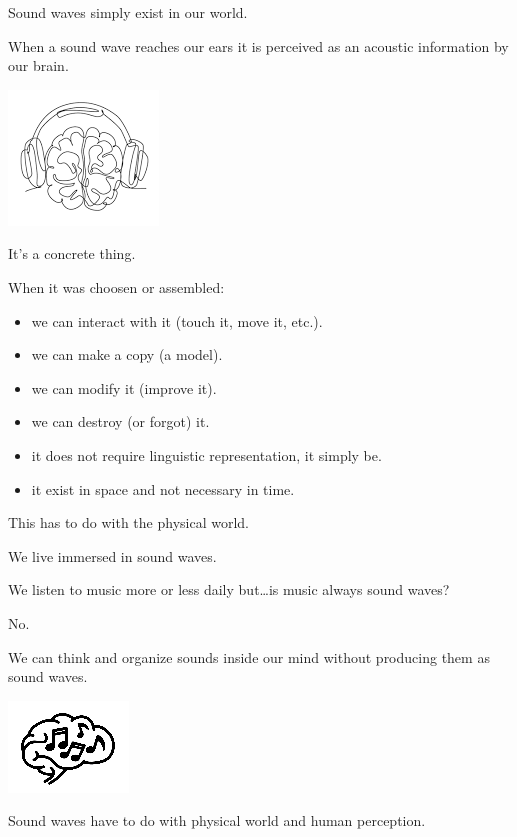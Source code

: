 Sound waves simply exist in our world.

When a sound wave reaches our ears it is perceived as an acoustic information by our brain.

\begin{center}
\includegraphics[scale=0.5]{../img/percezione.png}
\end{center}

It's a concrete thing.

When it was choosen or assembled:

\begin{itemize}
\tightlist
\item we can interact with it (touch it, move it, etc.).
\item we can make a copy (a model).
\item we can modify it (improve it).
\item we can destroy (or forgot) it.
\item it does not require linguistic representation, it simply be.
\item it exist in space and not necessary in time.
\end{itemize}

This has to do with the physical world.

We live immersed in sound waves.

We listen to music more or less daily but\ldots is music always sound waves?

No.

We can think and organize sounds inside our mind without producing them as sound waves.

\begin{center}
\includegraphics[scale=0.65]{../img/musicervice.png}
\end{center}

Sound waves have to do with physical world and human perception.

